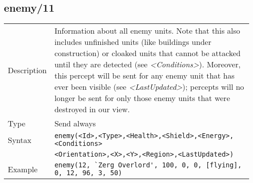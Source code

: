 \subsection{enemy/11}
\begin{tabularx}{\textwidth}{lX}
 Description & Information about all enemy units. Note that this also includes unfinished units (like buildings under construction) or cloaked units that cannot be attacked until they are detected (see \mbox{\textit{<Conditions>}}). Moreover, this percept will be sent for any enemy unit that has ever been visible (see \mbox{\textit{<LastUpdated>}}); percepts will no longer be sent for only those enemy units that were destroyed in our view.\\
 Type & Send always \\
 Syntax & \verb|enemy(<Id>,<Type>,<Health>,<Shield>,<Energy>,<Conditions>| \\ & \quad \verb|<Orientation>,<X>,<Y>,<Region>,<LastUpdated>)| \\
 Example & \verb|enemy(12, `Zerg Overlord', 100, 0, 0, [flying], 0, 12, 96, 3, 50)| \\
 \end{tabularx}
